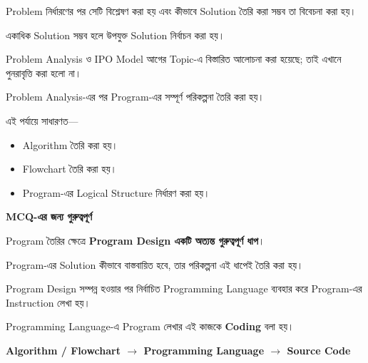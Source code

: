 Problem নির্ধারণের পর সেটি বিশ্লেষণ করা হয় এবং কীভাবে
Solution তৈরি করা সম্ভব তা বিবেচনা করা হয়।

একাধিক Solution সম্ভব হলে উপযুক্ত Solution নির্বাচন করা হয়।

Problem Analysis ও IPO Model আগের Topic-এ বিস্তারিত আলোচনা
করা হয়েছে; তাই এখানে পুনরাবৃত্তি করা হলো না।


Problem Analysis-এর পর Program-এর সম্পূর্ণ পরিকল্পনা তৈরি করা হয়।

এই পর্যায়ে সাধারণত—

\begin{itemize}

\item Algorithm তৈরি করা হয়।

\item Flowchart তৈরি করা হয়।

\item Program-এর Logical Structure নির্ধারণ করা হয়।

\end{itemize}

\begin{rememberbox}

\textbf{\color{deepOrange}MCQ-এর জন্য গুরুত্বপূর্ণ}

Program তৈরির ক্ষেত্রে
\textbf{Program Design একটি অত্যন্ত গুরুত্বপূর্ণ ধাপ}।

Program-এর Solution কীভাবে বাস্তবায়িত হবে, তার পরিকল্পনা
এই ধাপেই তৈরি করা হয়।

\end{rememberbox}


Program Design সম্পন্ন হওয়ার পর নির্বাচিত Programming Language
ব্যবহার করে Program-এর Instruction লেখা হয়।

Programming Language-এ Program লেখার এই কাজকে
\textbf{Coding} বলা হয়।

\begin{center}

\textbf{
Algorithm / Flowchart
\(\longrightarrow\)
Programming Language
\(\longrightarrow\)
Source Code
}

\end{center}

